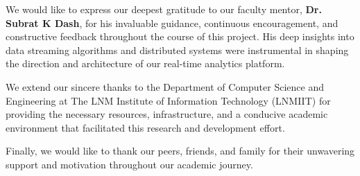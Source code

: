 We would like to express our deepest gratitude to our faculty mentor, \textbf{Dr. Subrat K Dash}, for his invaluable guidance, continuous encouragement, and constructive feedback throughout the course of this project. His deep insights into data streaming algorithms and distributed systems were instrumental in shaping the direction and architecture of our real-time analytics platform. 

We extend our sincere thanks to the Department of Computer Science and Engineering at The LNM Institute of Information Technology (LNMIIT) for providing the necessary resources, infrastructure, and a conducive academic environment that facilitated this research and development effort. 

Finally, we would like to thank our peers, friends, and family for their unwavering support and motivation throughout our academic journey.
